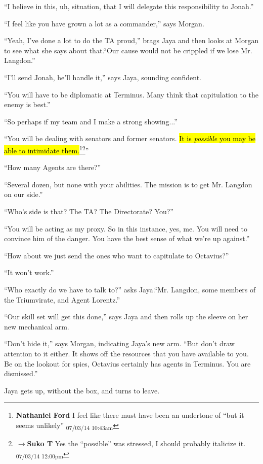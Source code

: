 ``I believe in this, uh, situation, that I will delegate this responsibility to Jonah.''

``I feel like you have grown a lot as a commander,'' says Morgan.

``Yeah, I've done a lot to do the TA proud,'' brags Jaya and then looks at Morgan to see what she says about that.``Our cause would not be crippled if we lose Mr. Langdon.''

``I'll send Jonah, he'll handle it,'' says Jaya, sounding confident.

``You will have to be diplomatic at Terminus.  Many think that capitulation to the enemy is best.''

``So perhaps if my team and I make a strong showing...''

``You will be dealing with senators and former senators.  \hl{It is \textit{possible }you may be able to intimidate them.}\footnote{\textbf{Nathaniel Ford }I feel like there must have been an undertone of ``but it seems unlikely'' \textsubscript{07/03/14 10:43am}}\footnote{$\rightarrow$\textbf{Suko T }Yes the ``possible'' was stressed, I should probably italicize it. \textsubscript{07/03/14 12:00pm}}''

``How many Agents are there?''

``Several dozen, but none with your abilities.  The mission is to get Mr. Langdon on our side.''

``Who's side is that?  The TA?  The Directorate?  You?''

``You will be acting as my proxy.  So in this instance, yes, me.  You will need to convince him of the danger.  You have the best sense of what we're up against.''

``How about we just send the ones who want to capitulate to Octavius?''

``It won't work.''

``Who exactly do we have to talk to?'' asks Jaya.``Mr. Langdon, some members of the Triumvirate, and Agent Lorentz.''

``Our skill set will get this done,'' says Jaya and then rolls up the sleeve on her new mechanical arm.

``Don't hide it,'' says Morgan, indicating Jaya's new arm. ``But don't draw attention to it either.  It shows off the resources that you have available to you.  Be on the lookout for spies, Octavius certainly has agents in Terminus.  You are dismissed.''

Jaya gets up, without the box, and turns to leave.

